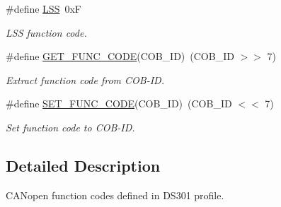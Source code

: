 \begin{DoxyCompactItemize}
\#define \mbox{\hyperlink{group___c_a_nopen___func___codes_gaa09b700d4c6a1eac2a3068f446c397e2}{L\+SS}}~0xF
\begin{DoxyCompactList}\small\item\em L\+SS function code. \end{DoxyCompactList}\item 
\mbox{\label{group___c_a_nopen___func___codes_gad4585eb139cc908014093ce9b81d0d51}} 
\#define \mbox{\hyperlink{group___c_a_nopen___func___codes_gad4585eb139cc908014093ce9b81d0d51}{G\+E\+T\+\_\+\+F\+U\+N\+C\+\_\+\+C\+O\+DE}}(C\+O\+B\+\_\+\+ID)~(C\+O\+B\+\_\+\+ID $>$$>$ 7)
\begin{DoxyCompactList}\small\item\em Extract function code from C\+O\+B-\/\+ID. \end{DoxyCompactList}\item 
\mbox{\label{group___c_a_nopen___func___codes_gade75ae84ef68190e83a60643194e91fd}} 
\#define \mbox{\hyperlink{group___c_a_nopen___func___codes_gade75ae84ef68190e83a60643194e91fd}{S\+E\+T\+\_\+\+F\+U\+N\+C\+\_\+\+C\+O\+DE}}(C\+O\+B\+\_\+\+ID)~(C\+O\+B\+\_\+\+ID $<$$<$ 7)
\begin{DoxyCompactList}\small\item\em Set function code to C\+O\+B-\/\+ID. \end{DoxyCompactList}\end{DoxyCompactItemize}


\subsection{Detailed Description}
C\+A\+Nopen function codes defined in D\+S301 profile. 